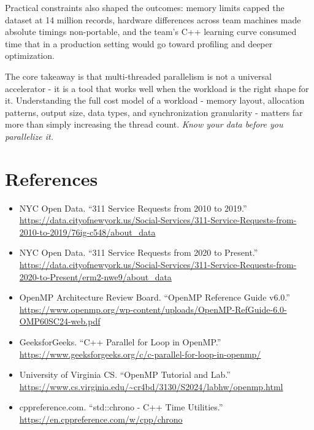 \documentclass[12pt]{article}
\begin{document}
Practical constraints also shaped the outcomes: memory limits capped the
dataset at 14 million records, hardware differences across team machines made
absolute timings non-portable, and the team's C++ learning curve consumed
time that in a production setting would go toward profiling and deeper
optimization.

The core takeaway is that multi-threaded parallelism is not a universal
accelerator - it is a tool that works well when the workload is the right
shape for it. Understanding the full cost model of a workload - memory
layout, allocation patterns, output size, data types, and synchronization
granularity - matters far more than simply increasing the thread count.
\textit{Know your data before you parallelize it.}
\section*{References}

\begin{itemize}
  \item NYC Open Data. ``311 Service Requests from 2010 to 2019.''\\
    \url{https://data.cityofnewyork.us/Social-Services/311-Service-Requests-from-2010-to-2019/76ig-c548/about_data}
  \item NYC Open Data. ``311 Service Requests from 2020 to Present.''\\
    \url{https://data.cityofnewyork.us/Social-Services/311-Service-Requests-from-2020-to-Present/erm2-nwe9/about_data}
  \item OpenMP Architecture Review Board. ``OpenMP Reference Guide v6.0.''\\
    \url{https://www.openmp.org/wp-content/uploads/OpenMP-RefGuide-6.0-OMP60SC24-web.pdf}
  \item GeeksforGeeks. ``C++ Parallel for Loop in OpenMP.''\\
    \url{https://www.geeksforgeeks.org/c/c-parallel-for-loop-in-openmp/}
  \item University of Virginia CS. ``OpenMP Tutorial and Lab.''\\
    \url{https://www.cs.virginia.edu/~cr4bd/3130/S2024/labhw/openmp.html}
  \item cppreference.com. ``std::chrono - C++ Time Utilities.''\\
    \url{https://en.cppreference.com/w/cpp/chrono}
\end{itemize}
\end{document}
